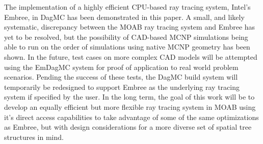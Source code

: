 \documentclass{anstrans}
\begin{document}
The implementation of a highly efficient CPU-based ray tracing system, Intel's Embree, in DagMC has been demonstrated in this paper. A small, and likely systematic, discrepancy between the MOAB ray tracing system and Embree has yet to be resolved, but the possibility of CAD-based MCNP simulations being able to run on the order of simulations using native MCNP geometry has been shown.
In the future, test cases on more complex CAD models will be attempted using the EmDagMC system for proof of application to real world problem scenarios. Pending the success of these tests, the DagMC build system will temporarily be redesigned to support Embree as the underlying ray tracing system if specified by the user. In the long term, the goal of this work will be to develop an equally efficient but more flexible ray tracing system in MOAB using it's direct access capabilities to take advantage of some of the same optimizations as Embree, but with design considerations for a more diverse set of spatial tree structures in mind. 

\vspace{-0.2cm}


\end{document}
